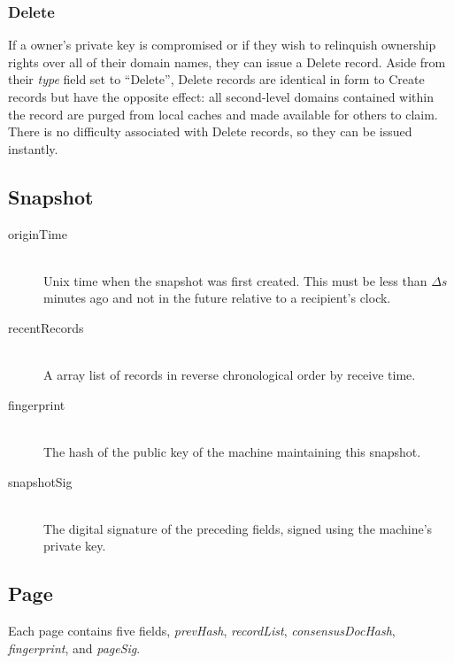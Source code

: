 \subsubsection{Delete}


If a owner's private key is compromised or if they wish to relinquish ownership rights over all of their domain names, they can issue a Delete record. Aside from their \emph{type} field set to ``Delete'', Delete records are identical in form to Create records but have the opposite effect: all second-level domains contained within the record are purged from local caches and made available for others to claim. There is no difficulty associated with Delete records, so they can be issued instantly.

\subsection{Snapshot}

\begin{description}
	\item[originTime] \hfill \\
		Unix time when the snapshot was first created. This must be less than $ \Delta s $ minutes ago and not in the future relative to a recipient's clock.
	\item[recentRecords] \hfill \\
		A array list of records in reverse chronological order by receive time.
	\item[fingerprint] \hfill \\
		The hash of the public key of the machine maintaining this snapshot.
	\item[snapshotSig] \hfill \\
		The digital signature of the preceding fields, signed using the machine's private key.
\end{description}


\subsection{Page}

Each page contains five fields, \emph{prevHash}, \emph{recordList}, \emph{consensusDocHash}, \emph{fingerprint}, and \emph{pageSig}.

